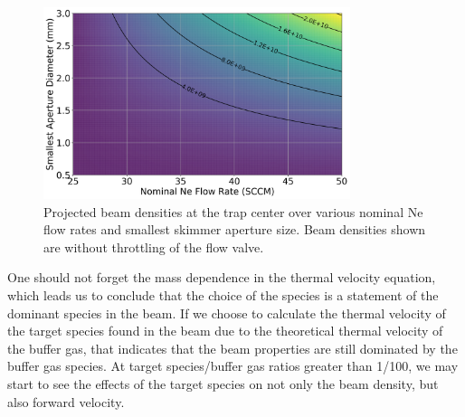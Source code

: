 \begin{figure}[H]
	\centering
	\includegraphics[width=0.8\textwidth]{images/CBGB_trap_density_aperture.png}
	\caption{Projected beam densities at the trap center over various nominal Ne flow rates and smallest skimmer aperture size. Beam densities shown are without throttling of the  flow valve.}
	\label{fig: trap_density}
\end{figure}

One should not forget the mass dependence in the thermal velocity equation, which leads us to conclude that the choice of the species is a statement of the dominant species in the beam. If we choose to calculate the thermal velocity of the target species found in the beam due to the theoretical thermal velocity of the buffer gas, that indicates that the beam properties are still dominated by the buffer gas species. At target species/buffer gas ratios greater than 1/100, we may start to see the effects of the target species on not only the beam density, but also forward velocity.